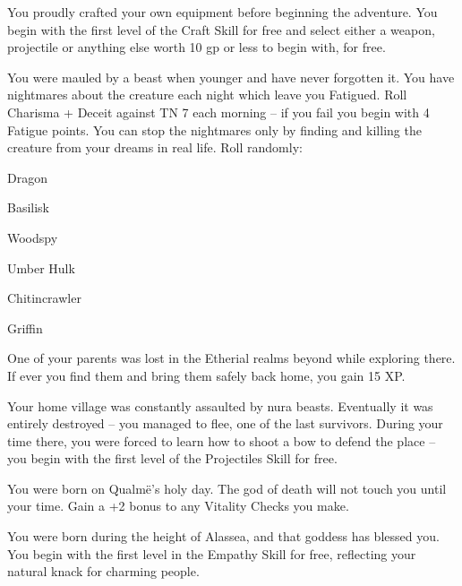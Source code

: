 \begin{list}{\addtocounter{list}{1}\textbf{:}}{\raggedleft}
\item{You proudly crafted your own equipment before beginning the adventure.  You begin with the first level of the Craft Skill for free and select either a weapon, projectile or anything else worth 10 gp or less to begin with, for free.}

\item{You were mauled by a beast when younger and have never forgotten it. You have nightmares about the creature each night which leave you Fatigued.  Roll Charisma + Deceit against TN 7 each morning -- if you fail you begin with 4 Fatigue points.  You can stop the nightmares only by finding and killing the creature from your dreams in real life.  Roll randomly:}

	\setcounter{enc}{6}

	\begin{list}{\addtocounter{enc}{-1}}{}

		\item Dragon

		\item Basilisk

		\item Woodspy

		\item Umber Hulk

		\item Chitincrawler

		\item Griffin

	\end{list}

\item{One of your parents was lost in the Etherial realms beyond while exploring there. If ever you find them and bring them safely back home, you gain 15 XP.}

\item{Your home village was constantly assaulted by nura beasts.  Eventually it was entirely destroyed -- you managed to flee, one of the last survivors. During your time there, you were forced to learn how to shoot a bow to defend the place -- you begin with the first level of the Projectiles Skill for free.}

\item{You were born on Qualm\"{e}'s holy day.  The god of death will not touch you until your time.  Gain a +2 bonus to any Vitality Checks you make.}

\item{You were born during the height of Alassea, and that goddess has blessed you.  You begin with the first level in the Empathy Skill for free, reflecting your natural knack for charming people.}


\end{list}
